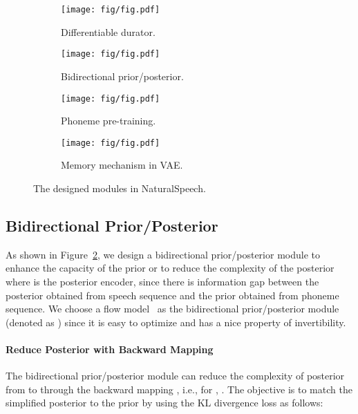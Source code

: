 \documentclass{article}
\theoremstyle{definition}
\def\myname{NaturalSpeech}
\begin{document}
\begin{figure} [t!]
\centering
    \begin{subfigure}[b]{0.32\textwidth}
    \texttt{[image: fig/fig.pdf]} 
    \caption{Differentiable durator.}
    \label{fig_model_dur}
    \end{subfigure}
    \begin{subfigure}[b]{0.67\textwidth}
    \texttt{[image: fig/fig.pdf]}
    \caption{Bidirectional prior/posterior.}
    \label{fig_model_bpp}
    \end{subfigure}\hspace{-0.7cm}
	\begin{subfigure}[b]{0.54\textwidth}
    \texttt{[image: fig/fig.pdf]}
    \caption{Phoneme pre-training.}
    \label{fig_model_pho}
    \end{subfigure}\hspace{0.0cm}
    \begin{subfigure}[b]{0.39\textwidth}
    \texttt{[image: fig/fig.pdf]} 
    \caption{Memory mechanism in VAE.}
    \label{fig_model_mem}
    \end{subfigure}
\caption{The designed modules in \myname{}.}
\label{fig_each_design}
\vspace{-0.2cm}
\end{figure}



\subsection{Bidirectional Prior/Posterior}
\label{sec_bidirect_flow}

As shown in Figure~\ref{fig_model_bpp}, we design a bidirectional prior/posterior module to enhance the capacity of the prior  or to reduce the complexity of the posterior  where  is the posterior encoder, since there is information gap between the posterior obtained from speech sequence and the prior obtained from phoneme sequence. We choose a flow model~\cite{dinh2014nice,rezende2015variational,kingma2016improved,kingma2018glow} as the bidirectional prior/posterior module (denoted as ) since it is easy to optimize and has a nice property of invertibility. 

\paragraph{Reduce Posterior  with Backward Mapping }
The bidirectional prior/posterior module can reduce the complexity of posterior from  to  through the backward mapping , i.e., for , . The objective is to match the simplified posterior  to the prior  by using the KL divergence loss as follows:
\end{document}
